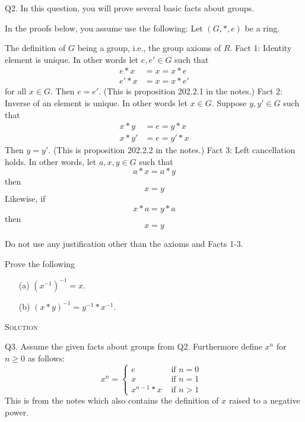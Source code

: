 

\newpage
Q2.
In this question, you will prove several basic facts about groups.

In the proofs below, you assume use the following:
Let $(G, *, e)$ be a ring. 
\begin{enumerate}[nosep]
 \li The definition of $G$ being a group, i.e., the group axioms of $R$.
 \li Fact 1: Identity element is unique. In other words let $e,e' \in G$
 such that
 \begin{align*} 
  e * x &= x = x * e \\
  e' * x &= x = x * e'   
 \end{align*}  
 for all $x \in G$. Then $e = e'$.
 (This is proposition 202.2.1 in the notes.)
 \li Fact 2: Inverse of an element is unique.
 In other words let $x \in G$. Suppose $y,y' \in G$ such that
 \begin{align*} 
  x * y &= e = y * x \\
  x * y' &= e = y' * x   
 \end{align*}
 Then $y = y'$.
 (This is proposition 202.2.2 in the notes.)
 \li Fact 3: Left cancellation holds.
 In other words,
 let $a,x,y \in G$ such that
 \[
 a * x = a * y
 \]
 then
 \[
 x = y
 \]
 Likewise, if
 \[
 x * a = y * a
 \]
 then
 \[
 x = y
 \]
\end{enumerate}
Do not use any justification other than the axioms and Facts 1-3.

Prove the following
\begin{enumerate}
\item[(a)] $(x^{-1})^{-1} = x$.
\item[(b)] $(x * y)^{-1} = y^{-1} * x^{-1}$.
\end{enumerate}

\textsc{Solution}



\newpage
Q3.
Assume the given facts about groups from Q2.
Furthermore define $x^n$ for $n \geq 0$ as follows:
\[
x^n =
\begin{cases}
e           & \text{ if $n = 0$ } \\
x           & \text{ if $n = 1$ } \\
x^{n-1} * x  & \text{ if $n > 1$ }
\end{cases}
\]
This is from the notes which also contains the definition of $x$ raised to a
negative power.

